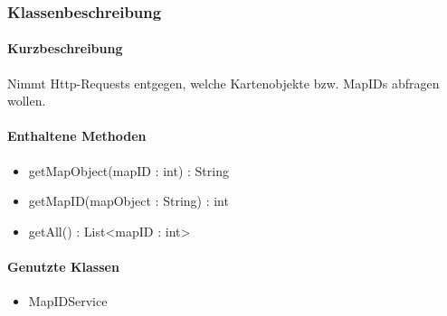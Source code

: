 \subsubsection*{Klassenbeschreibung}%
\paragraph*{Kurzbeschreibung}
Nimmt Http-Requests entgegen, welche Kartenobjekte bzw. MapIDs abfragen wollen.
\paragraph*{Enthaltene Methoden}
\begin{itemize}
    \item getMapObject(mapID : int) : String
    \item getMapID(mapObject : String) : int
    \item getAll() : List<mapID : int>
\end{itemize}
\paragraph*{Genutzte Klassen}
\begin{itemize}
    \item MapIDService
\end{itemize}
